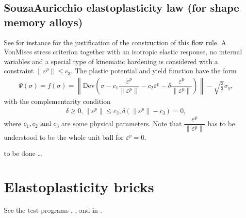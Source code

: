 \documentclass[a4paper,11pt,english]{sphinxmanual}
\begin{document}
\subsection{Souza\sphinxhyphen{}Auricchio elastoplasticity law (for shape memory alloys)}
\label{\detokenize{userdoc/model_plasticity_small_strain:souza-auricchio-elastoplasticity-law-for-shape-memory-alloys}}
See for instance  for the justification of the construction of this flow rule. A Von\sphinxhyphen{}Mises stress criterion together with an isotropic elastic response, no internal variables and a special type of kinematic hardening is considered with a constraint \(\|\varepsilon^p\| \le c_3\). The plastic potential and yield function have the form
\begin{equation*}
\begin{split}\Psi(\sigma) = f(\sigma)  = \left\|\mbox{Dev}\left(\sigma - c_1\dfrac{\varepsilon^p}{\|\varepsilon^p\|} - c_2\varepsilon^p - \delta \dfrac{\varepsilon^p}{\|\varepsilon^p\|}\right)\right\| - \sqrt{\frac{2}{3}}\sigma_{y},\end{split}
\end{equation*}
with the complementarity condition
\begin{equation*}
\begin{split}\delta \ge 0, \|\varepsilon^p\| \le c_3,  \delta (\|\varepsilon^p\|-c_3) = 0,\end{split}
\end{equation*}
where \(c_1, c_2 \mbox{ and } c_3\) are some physical parameters. Note that \(\dfrac{\varepsilon^p}{\|\varepsilon^p\|}\) has to be understood to be the whole unit ball for \(\varepsilon^p = 0\).

to be done …


\section{Elasto\sphinxhyphen{}plasticity bricks}
\label{\detokenize{userdoc/model_plasticity_small_strain:elasto-plasticity-bricks}}
See the test programs , ,  and in .
\end{document}
